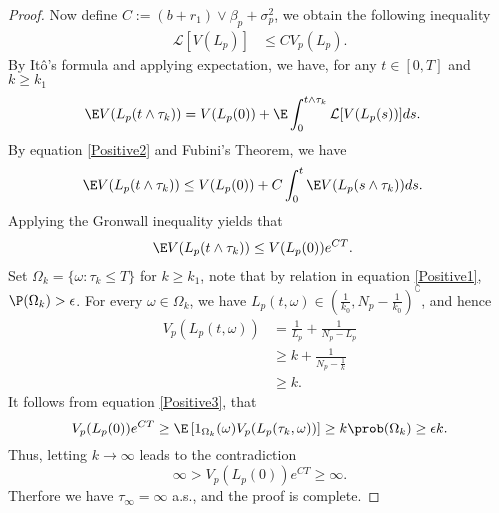 \begin{proof}
		Now define $C := (b+r_1) \vee \beta_p +\sigma_p^2$, we obtain the 
	following inequality
	\begin{align}\label{Positive2}
		\mathcal{L}[V(L_p)] 
			&\leq		
				C V_p(L_p).
	\end{align}
%
	By It\^{o}'s formula and applying expectation, we have, for any 
	$t \in [0,T]$ and $k\geq k_1$
	\begin{align*}
		\E V(L_p(t\wedge\tau_k)) &= 
			V(L_p(0)) + 
			\E 
				\int_{0}^{t\wedge\tau_k} \mathcal{L}[V(L_p(s))]
			ds.
	\end{align*}
	By equation \eqref{Positive2} and Fubini's Theorem, we have
	\begin{align*}
		\E V(L_p(t\wedge\tau_k)) 
			&\leq 
				V(L_p(0)) + 
				C
				\int_{0}^{t}
					\E V(L_p(s\wedge\tau_k))
				ds.
	\end{align*}
	Applying the Gronwall inequality yields that	
	\begin{align}\label{Positive3}
		\E V(L_p(t\wedge\tau_k))&\leq V(L_p(0))e^{CT}.
	\end{align}
%
	Set 
	$
		\Omega_k = \{\omega : \tau_k\leq T\}
	$ for $k\geq k_1$, note that by relation in equation 
	\eqref{Positive1}, 
	$
		\P(\Omega_k) >  \epsilon
	$. For every 
	$
		\omega \in \Omega_k
	$, we have 
	$
		L_p(t,\omega) \in 
		\left(
			\frac{1}{k_0}, N_p - 
			\frac{1}{k_0}
		\right) ^ {\complement}
	$, and hence
	\begin{align*}
		V_p(L_p(t,\omega))
			&=
				\frac{1}{L_p}+\frac{1}{N_p-L_p}\\
			&\geq 
				k +\frac{1}{N_p-\frac{1}{k}}\\
			&\geq k.
	\end{align*}
%	
	It follows from equation \eqref{Positive3}, that
	\begin{equation*}
		V_p(L_p(0)) e^{CT}
			\geq 
			\E 
			\left[
				1_{\Omega_k} (\omega)
				V_p(L_p(\tau_k,\omega))
			\right]
			\geq k
			\prob (\Omega_k)\geq \epsilon k.
	\end{equation*}
%
	Thus, letting $k\rightarrow \infty$ leads to the contradiction
	\begin{equation*}
		\infty>V_p(L_p(0))e^{CT}\geq \infty.	
	\end{equation*}
%
	Therfore we  have $\tau_\infty=\infty$ a.s., and the proof is 
	complete.	
\end{proof}
